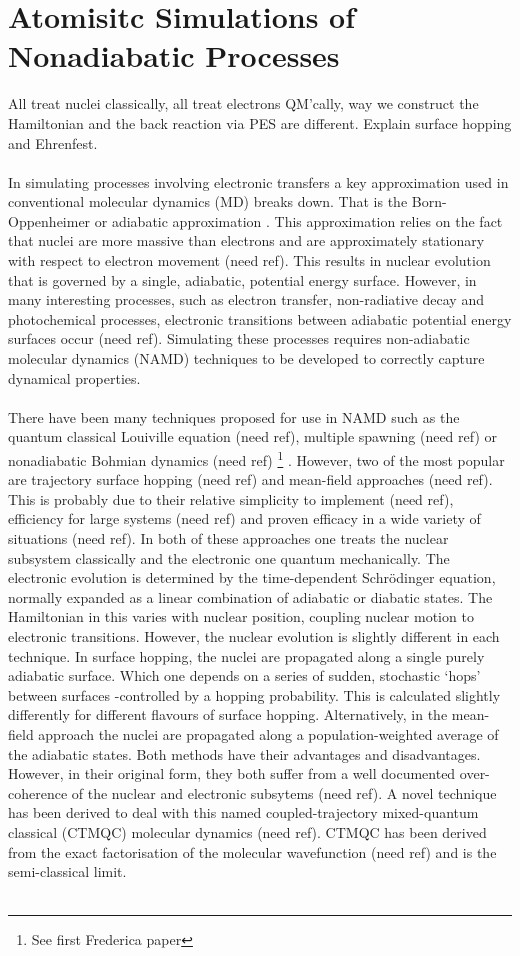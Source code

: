 \section{Atomisitc Simulations of Nonadiabatic Processes}
{\LARGE All treat nuclei classically, all treat electrons QM'cally, way we construct the Hamiltonian and the back reaction via PES are different. Explain surface hopping and Ehrenfest.}
\\\\
In simulating processes involving electronic transfers a key approximation used in conventional molecular dynamics (MD) breaks down. That is the Born-Oppenheimer or adiabatic approximation \cite{john_c._tully_nonadiabatic_nodate}. This approximation relies on the fact that nuclei are more massive than electrons and are approximately stationary with respect to electron movement (need ref). This results in nuclear evolution that is governed by a single, adiabatic, potential energy surface. However, in many interesting processes, such as electron transfer, non-radiative decay and photochemical processes, electronic transitions between adiabatic potential energy surfaces occur (need ref). Simulating these processes requires non-adiabatic molecular dynamics (NAMD) techniques to be developed to correctly capture dynamical properties.
\\\\
There have been many techniques proposed for use in NAMD such as the quantum classical Louiville equation (need ref), multiple spawning (need ref) or nonadiabatic Bohmian dynamics (need ref) \footnote{See first Frederica paper} . However, two of the most popular are trajectory surface hopping (need ref) and mean-field approaches (need ref). This is probably due to their relative simplicity to implement (need ref), efficiency for large systems (need ref) and proven efficacy in a wide variety of situations (need ref). In both of these approaches one treats the nuclear subsystem classically and the electronic one quantum mechanically. The electronic evolution is determined by the time-dependent Schr\"odinger equation, normally expanded as a linear combination of adiabatic or diabatic states. The Hamiltonian in this varies with nuclear position, coupling nuclear motion to electronic transitions. However, the nuclear evolution is slightly different in each technique. In surface hopping, the nuclei are propagated along a single purely adiabatic surface. Which one depends on a series of sudden, stochastic `hops' between surfaces -controlled by a hopping probability. This is calculated slightly differently for different flavours of surface hopping. Alternatively, in the mean-field approach the nuclei are propagated along a population-weighted average of the adiabatic states. Both methods have their advantages and disadvantages. However, in their original form, they both suffer from a well documented over-coherence of the nuclear and electronic subsytems (need ref). A novel technique has been derived to deal with this named coupled-trajectory mixed-quantum classical (CTMQC) molecular dynamics (need ref). CTMQC has been derived from the exact factorisation of the molecular wavefunction (need ref) and is the semi-classical limit.
\\
\\
